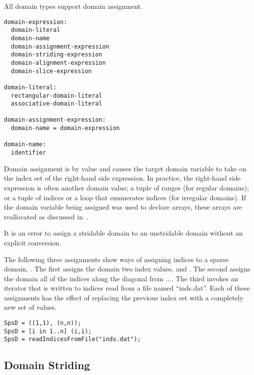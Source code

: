 All domain types support domain assignment.  

\begin{syntax}
\begin{verbatim}
domain-expression:
  domain-literal
  domain-name
  domain-assignment-expression
  domain-striding-expression
  domain-alignment-expression
  domain-slice-expression

domain-literal:
  rectangular-domain-literal
  associative-domain-literal

domain-assignment-expression:
  domain-name = domain-expression

domain-name:
  identifier
\end{verbatim}
\end{syntax}

Domain assignment is by
value and causes the target domain variable to take on the index set
of the right-hand side expression.  In practice, the right-hand side
expression is often another domain value; a tuple of ranges (for
regular domains); or a tuple of indices or a loop that enumerates
indices (for irregular domains).  If the domain variable being
assigned was used to declare arrays, these arrays are reallocated as
discussed in~.

It is an error to assign a stridable domain to an unstridable domain
without an explicit conversion.

\begin{example}
The following three assignments show ways of assigning indices to a
sparse domain, .  The first assigns the domain two index
values,  and .  The second assigns the domain
all of the indices along the diagonal from
$\ldots$.  The third invokes an iterator that
is written to  indices read from a file named
``inds.dat''.  Each of these assignments has the effect of replacing
the previous index set with a completely new set of values.
\begin{chapel}
\begin{verbatim}
SpsD = ((1,1), (n,n));
SpsD = [i in 1..n] (i,i);
SpsD = readIndicesFromFile("inds.dat");
\end{verbatim}
\end{chapel}
\end{example}

\subsection{Domain Striding}
\label{Domain_Striding}

